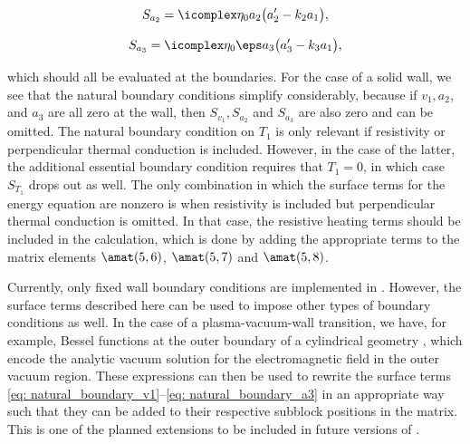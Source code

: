 \begin{equation} \label{eq: natural_boundary_a2}
  S_{a_2} = \icomplex \eta_0 a_2 \bigl(a_2' - k_2 a_1\bigr),
\end{equation}

\begin{equation} \label{eq: natural_boundary_a3}
  S_{a_3} = \icomplex \eta_0 \eps a_3 \bigl(a_3' - k_3 a_1\bigr),
\end{equation}

which should all be evaluated at the boundaries. For the case of a solid wall, we see that the natural boundary conditions simplify considerably, because if $v_1, a_2$, and $a_3$ are all zero at the wall, then $S_{v_1}, S_{a_2}$ and $S_{a_3}$ are also zero and can be omitted. The natural boundary condition on $T_1$ is only relevant if resistivity or perpendicular thermal conduction is included. However, in the case of the latter, the additional essential boundary condition requires that $T_1 = 0$, in which case $S_{T_1}$ drops out as well. The only combination in which the surface terms for the energy equation are nonzero is when resistivity is included but perpendicular thermal conduction is omitted. In that case, the resistive heating terms should be included in the calculation, which is done by adding the appropriate terms to the matrix elements $\amat(5, 6)$, $\amat(5, 7)$ and $\amat(5, 8)$.

Currently, only fixed wall boundary conditions are implemented in {\legolas}. However, the surface terms described here can be used to impose other types of boundary conditions as well. In the case of a plasma-vacuum-wall transition, we have, for example, Bessel functions at the outer boundary of a cylindrical geometry \citep{book_roberts}, which encode the analytic vacuum solution for the electromagnetic field in the outer vacuum region. These expressions can then be used to rewrite the surface terms \eqref{eq: natural_boundary_v1}--\eqref{eq: natural_boundary_a3} in an appropriate way such that they can be added to their respective subblock positions in the matrix. This is one of the planned extensions to be included in future versions of {\legolas}.

